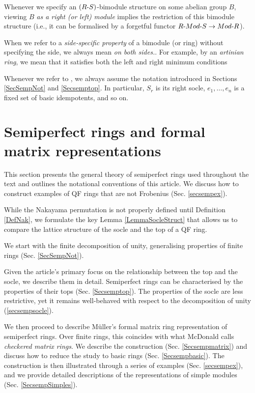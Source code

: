 \documentclass[11pt]{article}
\theoremstyle{plain}
\theoremstyle{remark}
\theoremstyle{plain}
\begin{document}
Whenever we specify an $(R\text-S)$-bimodule structure on some abelian group $B$, viewing $B$ \textit{as a right (or left) module} implies the restriction of this bimodule structure (i.e., it can be formalised by a forgetful functor $R\text- Mod\text- S\to  Mod\text-R$).

When we refer to a \textit{side-specific property} of a bimodule (or ring) without specifying the side, we always mean \textit{on both sides.}. For example, by an \textit{artinian ring}, we mean that it satisfies both the left and right minimum conditions

Whenever we refer to , we always assume the notation introduced in Sections \ref{SecSempNot} and \ref{Secsemptop}. In particular, $S_r$ is its right socle, $e_1, \dots, e_n$ is a fixed set of basic idempotents, and so on. 









\section{Semiperfect rings and formal matrix representations}\label{SecSemp}

This section presents the general theory of semiperfect rings used throughout the text and outlines the notational conventions of this article. We discuss how to construct examples of QF rings that are not Frobenius (Sec. \ref{secsempex}). 

While the Nakayama permutation is not properly defined until Definition \ref{DefNak}, we formulate the key Lemma \ref{LemmaSocleStruct} that allows us to compare the lattice structure of the socle and the top of a QF ring.

\smallskip 

We start with the finite decomposition of unity, generalising properties of finite rings (Sec. \ref{SecSempNot}). 

Given the article's primary focus on the relationship between the top and the socle, we describe them in detail. Semiperfect rings can be characterised by the properties of their tops (Sec.  \ref{Secsemptop}). The properties of the socle are less restrictive, yet it remains well-behaved with respect to the decomposition of unity (\ref{secsempsocle}). 

We then proceed to describe Müller's formal matrix ring representation of semiperfect rings. Over finite rings, this coincides with what McDonald calls \textit{checkered matrix rings}. We describe the construction (Sec. \ref{Secsempmatrix}) and discuss how to reduce the study to basic rings (Sec. \ref{Secsempbasic}). The construction is then illustrated through a series of examples (Sec. \ref{secsempex}), and we provide detailed descriptions of the representations of simple modules (Sec. \ref{SecsempSimples}).  
\end{document}
